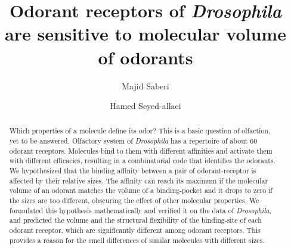 \documentclass[fleqn,10pt]{wlscirep} %
\title{Odorant receptors of \textit{Drosophila} are sensitive to molecular volume of odorants}
\author[1]{Majid Saberi}
\author[1,*]{Hamed Seyed-allaei}
\affil[1]{School of Cognitive Sciences, Institute for Research in Fundamental Sciences (IPM), Tehran, Iran}
\affil[*]{hamed@ipm.ir}
\begin{document}

\begin{abstract} 
Which properties of a molecule define its odor? This is a basic question of olfaction, 
yet to be answered. Olfactory system of \textit{Drosophila} has a repertoire of about 60 odorant receptors. 
Molecules bind to them with different affinities and activate them with different efficacies, 
resulting in a combinatorial code that identifies the odorants. 
We hypothesized that the binding affinity between a pair of odorant-receptor is affected by their relative sizes. 
The affinity can reach its maximum if the molecular volume of an odorant matches the volume of a binding-pocket 
and it drops to zero if the sizes are too different, 
obscuring the effect of other molecular properties. 
We formulated this hypothesis mathematically and verified it on the data of \textit{Drosophila}, 
and predicted the volume and the structural flexibility of the binding-site of each odorant receptor, 
which are significantly different among odorant receptors. 
This provides a reason for the smell differences of similar molecules with different sizes. 
\end{abstract}

\flushbottom
\maketitle
%
%
\thispagestyle{empty}




\end{document}
